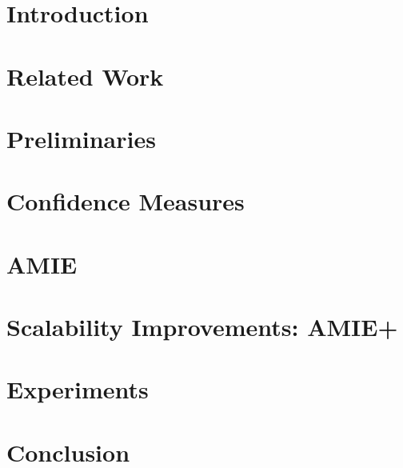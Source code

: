 \documentclass[twocolumn]{svjour3}          %
\begin{document}
\section{Introduction}
\label{sec:introduction}



\section{Related Work}
\label{sec:relatedWork}



\section{Preliminaries}
\label{sec:preliminaries}



\section{Confidence Measures}
\label{sec:pca}



\section{AMIE}
\label{sec:alg}



\section{Scalability Improvements: AMIE+}
\label{sec:improvements}



\section{Experiments}
\label{sec:experiments}



\section{Conclusion}
\label{sec:conclusion}



\balance
\end{document}

